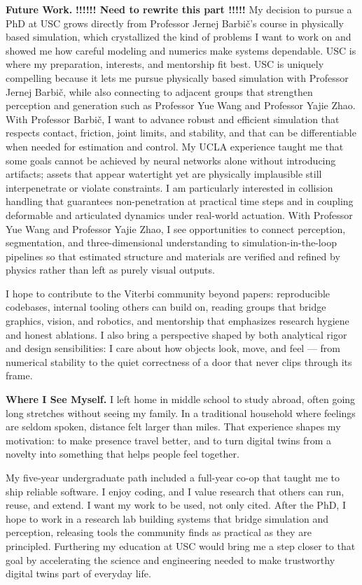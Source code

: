 \documentclass[11pt]{article}
\begin{document}
\textbf{Future Work.} \textbf{!!!!!! Need to rewrite this part !!!!!}
My decision to pursue a PhD at USC grows directly from Professor Jernej
Barbič's course in physically based simulation, which crystallized the kind of
problems I want to work on and showed me how careful modeling and numerics make
systems dependable. USC is where my preparation, interests, and mentorship fit
best. USC is uniquely compelling because it lets me pursue physically based
simulation with Professor Jernej Barbič, while also connecting to adjacent
groups that strengthen perception and generation such as Professor Yue Wang and
Professor Yajie Zhao. With Professor Barbič, I want to advance robust and
efficient simulation that respects contact, friction, joint limits, and
stability, and that can be differentiable when needed for estimation and control.
My UCLA experience taught me that some goals cannot be achieved by neural
networks alone without introducing artifacts; assets that appear watertight yet
are physically implausible still interpenetrate or violate constraints. I am
particularly interested in collision handling that guarantees non-penetration at
practical time steps and in coupling deformable and articulated dynamics under
real-world actuation. With Professor Yue Wang and Professor Yajie Zhao, I see
opportunities to connect perception, segmentation, and three-dimensional
understanding to simulation-in-the-loop pipelines so that estimated structure
and materials are verified and refined by physics rather than left as purely
visual outputs.

I hope to contribute to the Viterbi community beyond papers: reproducible
codebases, internal tooling others can build on, reading groups that bridge
graphics, vision, and robotics, and mentorship that emphasizes research hygiene
and honest ablations. I also bring a perspective shaped by both analytical rigor
and design sensibilities: I care about how objects look, move, and feel --- from
numerical stability to the quiet correctness of a door that never clips through
its frame.

\textbf{Where I See Myself.} 
I left home in middle school to study abroad, often going long stretches without
seeing my family. In a traditional household where feelings are seldom spoken,
distance felt larger than miles. That experience shapes my motivation: to make
presence travel better, and to turn digital twins from a novelty into something
that helps people feel together.

My five-year undergraduate path included a full-year co-op that taught me to
ship reliable software. I enjoy coding, and I value research that others can run,
reuse, and extend. I want my work to be used, not only cited. After the PhD, I
hope to work in a research lab building systems that bridge simulation and
perception, releasing tools the community finds as practical as they are
principled. Furthering my education at USC would bring me a step closer to that
goal by accelerating the science and engineering needed to make trustworthy
digital twins part of everyday life.
\end{document}
